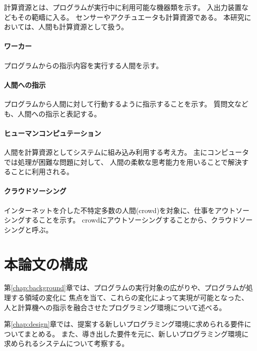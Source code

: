 計算資源とは、プログラムが実行中に利用可能な機器類を示す。
入出力装置などもその範疇に入る。
センサーやアクチュエータも計算資源である。
本研究においては、人間も計算資源として扱う。

\paragraph{ワーカー}\label{ux30efux30fcux30abux30fc}

プログラムからの指示内容を実行する人間を示す。

\paragraph{人間への指示}\label{ux4ebaux9593ux3078ux306eux6307ux793a}

プログラムから人間に対して行動するように指示することを示す。
質問文なども、人間への指示と表記する。

\paragraph{ヒューマンコンピュテーション}\label{ux30d2ux30e5ux30fcux30deux30f3ux30b3ux30f3ux30d4ux30e5ux30c6ux30fcux30b7ux30e7ux30f3}

人間を計算資源としてシステムに組み込み利用する考え方。
主にコンピュータでは処理が困難な問題に対して、
人間の柔軟な思考能力を用いることで解決することに利用される。

\paragraph{クラウドソーシング}\label{ux30afux30e9ux30a6ux30c9ux30bdux30fcux30b7ux30f3ux30b0}

インターネットを介した不特定多数の人間(crowd)を対象に、仕事をアウトソーシングすることを示す。
crowdにアウトソーシングすることから、クラウドソーシングと呼ぶ。

\section{本論文の構成}\label{ux672cux8ad6ux6587ux306eux69cbux6210}

第\ref{chap:background}章では、プログラムの実行対象の広がりや、プログラムが処理する領域の変化に
焦点を当て、これらの変化によって実現が可能となった、人と計算機への指示を融合させたプログラミング環境について述べる。

第\ref{chap:design}章では、提案する新しいプログラミング環境に求められる要件についてまとめる。
また、導き出した要件を元に、新しいプログラミング環境に求められるシステムについて考察する。

